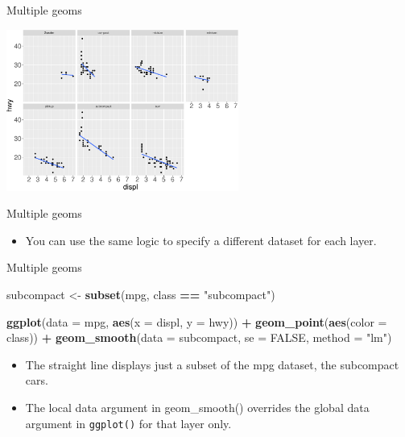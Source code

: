 \documentclass[ignorenonframetext,]{beamer}
\newenvironment{Shaded}{\begin{snugshade}}{\end{snugshade}}
\newcommand{\DataTypeTok}[1]{\textcolor[rgb]{0.13,0.29,0.53}{#1}}
\newcommand{\KeywordTok}[1]{\textcolor[rgb]{0.13,0.29,0.53}{\textbf{#1}}}
\newcommand{\NormalTok}[1]{#1}
\newcommand{\OperatorTok}[1]{\textcolor[rgb]{0.81,0.36,0.00}{\textbf{#1}}}
\newcommand{\OtherTok}[1]{\textcolor[rgb]{0.56,0.35,0.01}{#1}}
\newcommand{\StringTok}[1]{\textcolor[rgb]{0.31,0.60,0.02}{#1}}
\providecommand{\tightlist}{%
  \setlength{\itemsep}{0pt}\setlength{\parskip}{0pt}}
\begin{document}
\begin{frame}{Multiple geoms}
\protect\hypertarget{multiple-geoms-25}{}

\begin{center}\includegraphics[height=200px]{data-visualization_files/figure-beamer/unnamed-chunk-103-1} \end{center}

\end{frame}

\begin{frame}{Multiple geoms}
\protect\hypertarget{multiple-geoms-26}{}

\begin{itemize}
\tightlist
\item
  You can use the same logic to specify a different dataset for each
  layer.
\end{itemize}

\end{frame}

\begin{frame}[fragile]{Multiple geoms}
\protect\hypertarget{multiple-geoms-27}{}

\begin{Shaded}
\begin{Highlighting}[]
\NormalTok{subcompact <-}\StringTok{ }\KeywordTok{subset}\NormalTok{(mpg, class }\OperatorTok{==}\StringTok{ "subcompact"}\NormalTok{)}

\KeywordTok{ggplot}\NormalTok{(}\DataTypeTok{data =}\NormalTok{ mpg, }\KeywordTok{aes}\NormalTok{(}\DataTypeTok{x =}\NormalTok{ displ, }\DataTypeTok{y =}\NormalTok{ hwy)) }\OperatorTok{+}
\StringTok{  }\KeywordTok{geom_point}\NormalTok{(}\KeywordTok{aes}\NormalTok{(}\DataTypeTok{color =}\NormalTok{ class)) }\OperatorTok{+}
\StringTok{  }\KeywordTok{geom_smooth}\NormalTok{(}\DataTypeTok{data =}\NormalTok{ subcompact, }\DataTypeTok{se =} \OtherTok{FALSE}\NormalTok{, }
              \DataTypeTok{method =} \StringTok{"lm"}\NormalTok{)}
\end{Highlighting}
\end{Shaded}

\begin{itemize}
\item
  The straight line displays just a subset of the mpg dataset, the
  subcompact cars.
\item
  The local data argument in geom\_smooth() overrides the global data
  argument in \texttt{ggplot()} for that layer only.
\end{itemize}

\end{frame}
\end{document}
